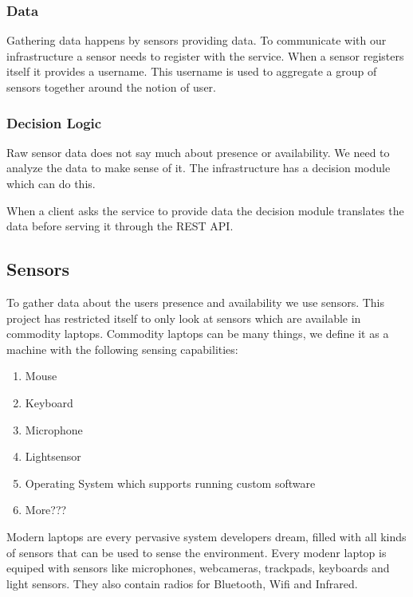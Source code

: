 \documentclass{sigchi}
\begin{document}
\subsubsection{Data}
Gathering data happens by sensors providing data.
To communicate with our infrastructure a sensor needs to register with the service.
When a sensor registers itself it provides a username.
This username is used to aggregate a group of sensors together around the notion of user.

\subsubsection{Decision Logic}
Raw sensor data does not say much about presence or availability.
We need to analyze the data to make sense of it.
The infrastructure has a decision module which can do this.

When a client asks the service to provide data the decision module translates the data before serving it through the REST API.

\subsection{Sensors}
To gather data about the users presence and availability we use sensors.
This project has restricted itself to only look at sensors which are available in commodity laptops.
Commodity laptops can be many things, we define it as a machine with the following sensing capabilities:
\begin{enumerate}
  \item Mouse
  \item Keyboard
  \item Microphone
  \item Lightsensor
  \item Operating System which supports running custom software
  \item More???
\end{enumerate}

Modern laptops are every pervasive system developers dream, filled with all kinds of sensors that can be used to sense the environment.
Every modenr laptop is equiped with sensors like microphones, webcameras, trackpads, keyboards and light sensors.
They also contain radios for Bluetooth, Wifi and Infrared.


\end{document}
